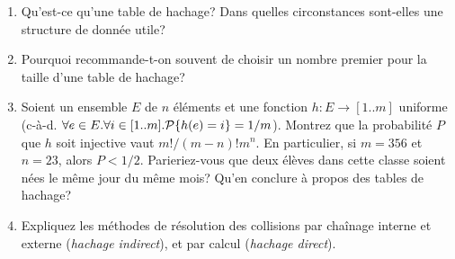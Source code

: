   \begin{enumerate}

    \item Qu'est-ce qu'une table de hachage? Dans quelles
      circonstances sont-elles une structure de donnée utile?

    \item Pourquoi recommande-t-on souvent de choisir un nombre
      premier pour la taille d'une table de hachage?

    \item Soient un ensemble \(E\) de \(n\) éléments et une fonction
      \(h: E \rightarrow [1..m]\) uniforme (c-à-d. \(\forall e \in
      E.\forall i \in [1..m].{\cal P} \{h(e)=i\}=1/m\)). Montrez que
      la probabilité \(P\) que \(h\) soit injective vaut \(m!/(m-n)!
      m^{n}\). En particulier, si \(m=356\) et \(n=23\), alors \(P <
      1/2\). Parieriez-vous que deux élèves dans cette classe soient
      nées le même jour du même mois? Qu'en conclure à propos des
      tables de hachage?

    \item Expliquez les méthodes de résolution des collisions par
      chaînage interne et externe (\emph{hachage indirect}), et par
      calcul (\emph{hachage direct}).

  \end{enumerate}
